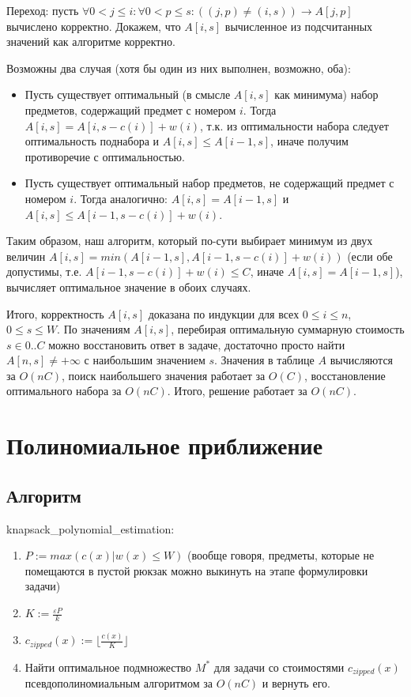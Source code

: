 \documentclass{article}
\begin{document}
	Переход: пусть $\forall 0 < j \leq i: \forall 0 < p \leq s : ((j, p) \neq (i, s)) \rightarrow A[j, p]$ вычислено корректно. Докажем, что $A[i, s]$ вычисленное из подсчитанных значений как алгоритме корректно.
	
	Возможны два случая (хотя бы один из них выполнен, возможно, оба):
	
	\begin{itemize}
		\item 
	Пусть существует оптимальный (в смысле $A[i, s]$ как минимума) набор предметов, содержащий предмет с номером $i$. Тогда $A[i, s] = A[i, s - c(i)] + w(i)$, т.к. из оптимальности набора следует оптимальность поднабора и $A[i, s] \leq A[i - 1, s]$, иначе получим противоречие с оптимальностью.
	
		\item 
	Пусть существует оптимальный набор предметов, не содержащий предмет с номером $i$. Тогда аналогично: $A[i, s] = A[i-1, s]$ и $A[i, s] \leq A[i-1, s - c(i)] + w(i)$.
	
	\end{itemize}

	Таким образом, наш алгоритм, который по-сути выбирает минимум из двух величин $A[i, s] = min(A[i - 1, s], A[i - 1, s - c(i)] + w(i))$ (если обе допустимы, т.е. $A[i - 1, s - c(i)] + w(i) \leq C$, иначе $A[i, s] = A[i-1, s]$), вычисляет оптимальное значение в обоих случаях. 
	
	Итого, корректность $A[i, s]$ доказана по индукции для всех $ 0 \leq i \leq n$, $0 \leq s \leq W$. По значениям $A[i, s]$, перебирая оптимальную суммарную стоимость $s \in 0..C$ можно восстановить ответ в задаче, достаточно просто найти $A[n, s] \neq +\infty$ с наибольшим значением $s$. Значения в таблице $A$ вычисляются за $O(nC)$, поиск наибольшего значения работает за $O(C)$, восстановление оптимального набора за $O(nC)$. Итого, решение работает за $O(nC)$.
\section{Полиномиальное приближение}
	\subsection{Алгоритм}

	knapsack\_polynomial\_estimation:
\begin{enumerate}
	\item $P := max(c(x) | w(x) \leq W)$ (вообще говоря, предметы, которые не помещаются в пустой рюкзак можно выкинуть на этапе формулировки задачи)
	\item $K := \frac{\varepsilon P}{k}$
	\item $c_{zipped}(x) := \lfloor \frac{c(x)}{K} \rfloor $
	\item Найти оптимальное подмножество $M^*$ для задачи со стоимостями $c_{zipped}(x)$ псевдополиномиальным алгоритмом за $O(nC)$ и вернуть его.
\end{enumerate}
\end{document}
